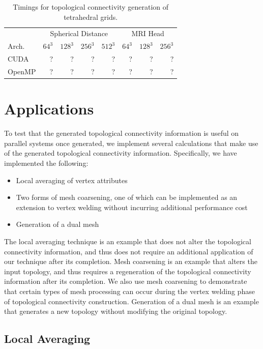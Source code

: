 \documentclass[journal]{vgtc}                %
\begin{document}
\begin{table}[h!]
\begin{center}
\begin{tabular}{l|r r r r|r r r}
 & \multicolumn{4}{|c|}{Spherical Distance} & \multicolumn{3}{|c}{MRI Head}\\
Arch. & $64^3$ & $128^3$ & $256^3$ & $512^3$ & $64^3$ & $128^3$ & $256^3$\\
\hline
CUDA & ? & ? & ? & ? & ? & ? & ? \\
OpenMP & ? & ? & ? & ? & ? & ? & ? \\
\end{tabular}
\end{center}
\caption{Timings for topological connectivity generation of tetrahedral grids.}
\label{tab:toptimingstetra}
\end{table}

\section{Applications}
To test that the generated topological connectivity information is useful on parallel systems once generated, we implement several calculations that make use of the generated topological connectivity information. Specifically, we have implemented the following:

\begin{itemize}
\item{Local averaging of vertex attributes}
\item{Two forms of mesh coarsening, one of which can be implemented as an extension to vertex welding without incurring additional performance cost}
\item{Generation of a dual mesh}
\end{itemize}

The local averaging technique is an example that does not alter the topological connectivity information, and thus does not require an additional application of our technique after its completion. Mesh coarsening is an example that alters the input topology, and thus requires a regeneration of the topological connectivity information after its completion. We also use mesh coarsening to demonstrate that certain types of mesh processing can occur during the vertex welding phase of topological connectivity construction. Generation of a dual mesh is an example that generates a new topology without modifying the original topology.

\subsection{Local Averaging}
\end{document}
